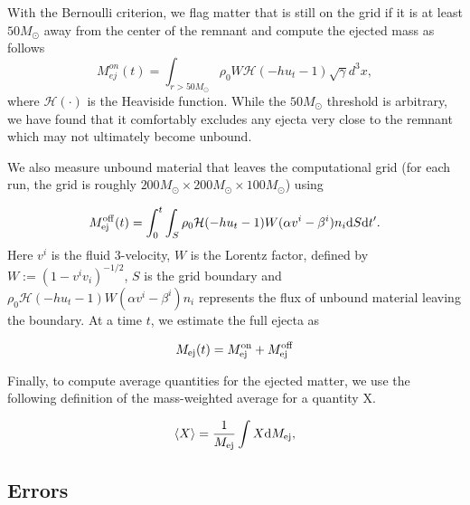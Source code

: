 With the Bernoulli criterion, we flag matter that is still on the grid if it is at least $50M_\odot$ away from the center of the remnant and compute the ejected mass as follows
%
\begin{equation}
M^{on}_{ej}(t) = \int_{r>50M_\odot}\rho_0 W\mathcal{H}(-hu_t - 1)\sqrt{\gamma}{d}^3x,
\end{equation}
%
%
where $\mathcal{H}(\cdot)$ is the Heaviside function. While the $50M_\odot$ threshold is arbitrary, we have found that it comfortably excludes any ejecta very close to the remnant which may not ultimately become unbound.

We also measure unbound material that leaves the computational grid (for each run, the grid is roughly $200M_\odot \times 200M_\odot \times 100M_\odot$) using

\begin{equation}
M^{\rm off}_{\rm ej}(t) = \int^t_0\int_S\rho_0\mathcal{H}(-hu_t - 1) W(\alpha v^i - \beta^i)n_i\mathrm{d}S\mathrm{d}t'.
\end{equation}
%
Here $v^i$ is the fluid 3-velocity, $W$ is the Lorentz factor, defined by $W := (1-v^iv_i)^{-1/2}$, $S$ is the grid boundary and $\rho_0 \mathcal{H}(-hu_t - 1)W(\alpha v^i - \beta^i)n_i$ represents the flux of unbound material leaving the boundary. At a time $t$, we estimate the full ejecta as

\begin{equation}
M_{\rm ej}(t) = M^{\rm on}_{\rm ej} + M^{\rm off}_{\rm ej}
\end{equation}

Finally, to compute average quantities for the ejected matter, we use the following definition of the mass-weighted average for a quantity X.

\begin{equation}
  \left< X \right> = \frac{1}{M_{\rm ej}}\int X \mathrm{d}M_{\rm ej},
\end{equation}


\subsection{Errors}

